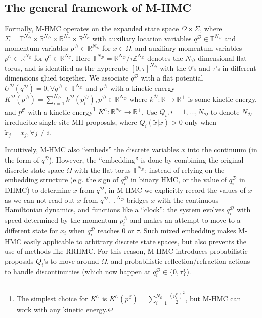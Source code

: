 \documentclass{article}
\newcommand{\cald}{\mathcal{D}}
\newcommand{\calc}{\mathcal{C}}
\begin{document}
\subsection{The general framework of M-HMC}\label{sec:framework}


Formally, M-HMC operates on the expanded state space $\Omega \times \Sigma$, where $\Sigma = \mathbb{T}^{N_\cald} \times \mathbb{R}^{N_\cald} \times \mathbb{R}^{N_\calc} \times \mathbb{R}^{N_\calc}$ with auxiliary location variables $q^\cald\in \mathbb{T}^{N_\cald}$ and momentum variables $p^\cald \in \mathbb{R}^{N_\cald}$ for $x\in\Omega$, and auxiliary momentum variables $p^\calc\in\mathbb{R}^{N_\calc}$ for $q^\calc\in\mathbb{R}^{N_\calc}$. Here $\mathbb{T}^{N_\cald} =\mathbb{R}^{N_\cald} /\tau\mathbb{Z}^{N_\cald}$ denotes the $N_\cald$-dimensional flat torus, and is identified as the hypercube $[0, \tau]^{N_\cald}$ with the 0's and $\tau$'s in different dimensions glued together. We associate $q^\cald$ with a flat potential $U^\cald (q^\cald) = 0, \forall q^\cald \in \mathbb{T}^{N_\cald}$ and $p^\cald$ with a kinetic energy $K^\cald(p^\cald)=\sum_{i = 1}^{N_\cald} k^\cald (p^\cald_i), p^\cald \in \mathbb{R}^{N_\cald}$ where $k^\cald : \mathbb{R} \rightarrow \mathbb{R}^+$ is some kinetic energy, and $p^\calc$ with a kinetic energy\footnote{The simplest choice for $K^\calc$ is $K^\calc(p^\calc)=\sum_{i=1}^{N_\calc}\frac{(p^\calc_i)^2}{2}$, but M-HMC can work with any kinetic energy.} $K^\calc:\mathbb{R}^{N_\calc}\rightarrow \mathbb{R}^+$. Use $Q_i, i = 1, \ldots, N_\cald$ to denote $N_\cald$ irreducible single-site MH proposals, where $Q_i (\tilde{x} |x) > 0$ only when $\tilde{x}_j = x_j, \forall j \neq i$.

Intuitively, M-HMC also ``embeds'' the discrete variables $x$ into the continuum (in the form of $q^\cald$). However, the ``embedding'' is done by combining the original discrete state space $\Omega$ with the flat torus $\mathbb{T}^{N_\cald}$: instead of relying on the embedding structure (e.g. the sign of $q^\cald_i$ in binary HMC, or the value of $q^\cald_i$ in DHMC) to determine $x$ from $q^\cald$, in M-HMC we explicitly record the values of $x$ as we can not read out $x$ from $q^\cald$. $\mathbb{T}^{N_\cald}$ bridges $x$ with the continuous Hamiltonian dynamics, and functions like a ``clock'': the system evolves $q^\cald_i$ with speed determined by the momentum $p^\cald_i$ and makes an attempt to move to a different state for $x_i$ when $q^\cald_i$ reaches $0$ or $\tau$. Such mixed embedding makes M-HMC easily applicable to arbitrary discrete state spaces, but also prevents the use of methods like RRHMC. For this reason, M-HMC introduces probabilistic proposals $Q_i$'s to move around $\Omega$, and probabilistic reflection/refraction actions to handle discontinuities (which now happen at $q^\cald_i\in\{0, \tau\}$).
\end{document}
